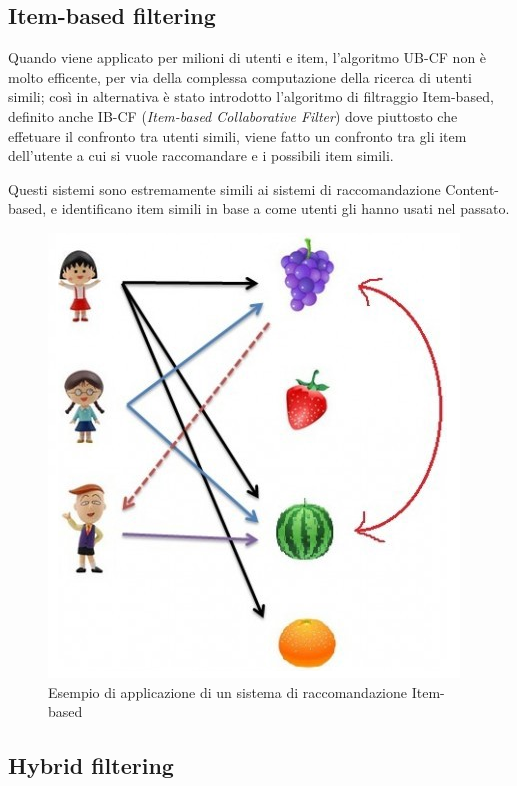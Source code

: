 


\subsection{Item-based filtering} 
Quando viene applicato per milioni di utenti e item, l'algoritmo UB-CF non è molto efficente, per via della complessa computazione della 
ricerca di utenti simili; così in alternativa è stato introdotto l'algoritmo di filtraggio Item-based, definito anche IB-CF 
(\textit{Item-based Collaborative Filter}) dove piuttosto che effetuare il confronto tra utenti simili, viene fatto un confronto tra 
gli item dell'utente a cui si vuole raccomandare e i possibili item simili.

Questi sistemi sono estremamente simili ai sistemi di raccomandazione Content-based, e identificano item simili in base a come utenti gli
hanno usati nel passato. \cite{item-based-collaborative-filtering}

\begin{figure}[ht!]
	\centering
	\includegraphics[scale=0.5]{images/IB_CF_ex.png}
	\caption{Esempio di applicazione di un sistema di raccomandazione Item-based}
	\label{fig:IB_CF}
\end{figure}



\subsection{Hybrid filtering} 


